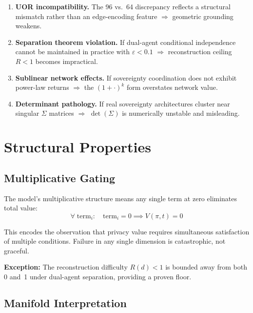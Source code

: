 \documentclass[11pt,a4paper]{article}
\begin{document}
\begin{enumerate}[label=\textbf{B\arabic*.}, leftmargin=2em]
    \item \textbf{UOR incompatibility.} The 96 vs.\ 64 discrepancy reflects a structural mismatch rather than an edge-encoding feature $\Rightarrow$ geometric grounding weakens.
    \item \textbf{Separation theorem violation.} If dual-agent conditional independence cannot be maintained in practice with $\varepsilon < 0.1$ $\Rightarrow$ reconstruction ceiling $R < 1$ becomes impractical.
    \item \textbf{Sublinear network effects.} If sovereignty coordination does not exhibit power-law returns $\Rightarrow$ the $(1 + \cdot)^k$ form overstates network value.
    \item \textbf{Determinant pathology.} If real sovereignty architectures cluster near singular $\Sigma$ matrices $\Rightarrow$ $\det(\Sigma)$ is numerically unstable and misleading.
\end{enumerate}

\section{Structural Properties}
\label{sec:structural}

\subsection{Multiplicative Gating}

The model's multiplicative structure means any single term at zero eliminates total value:
\begin{equation}
\forall\; \mathrm{term}_i:\quad \mathrm{term}_i = 0 \implies V(\pi, t) = 0
\end{equation}

\noindent This encodes the observation that privacy value requires simultaneous satisfaction of multiple conditions. Failure in any single dimension is catastrophic, not graceful.

\textbf{Exception:} The reconstruction difficulty $R(d) < 1$ is bounded away from both 0 and~1 under dual-agent separation, providing a proven floor.

\subsection{Manifold Interpretation}
\end{document}
